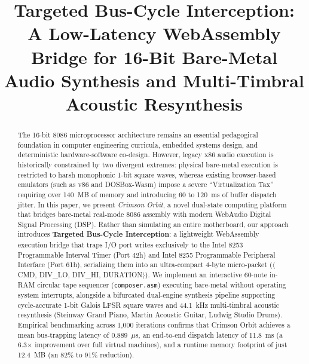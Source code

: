 \documentclass[conference]{IEEEtran}
\begin{document}
\title{Targeted Bus-Cycle Interception: A Low-Latency WebAssembly Bridge for 16-Bit Bare-Metal Audio Synthesis and Multi-Timbral Acoustic Resynthesis}

\author{
}

\maketitle

\begin{abstract}
The 16-bit 8086 microprocessor architecture remains an essential pedagogical foundation in computer engineering curricula, embedded systems design, and deterministic hardware-software co-design. However, legacy x86 audio execution is historically constrained by two divergent extremes: physical bare-metal execution is restricted to harsh monophonic 1-bit square waves, whereas existing browser-based emulators (such as v86 and DOSBox-Wasm) impose a severe ``Virtualization Tax'' requiring over 140~MB of memory and introducing 60 to 120~ms of buffer dispatch jitter. In this paper, we present \textit{Crimson Orbit}, a novel dual-state computing platform that bridges bare-metal real-mode 8086 assembly with modern WebAudio Digital Signal Processing (DSP). Rather than simulating an entire motherboard, our approach introduces \textbf{Targeted Bus-Cycle Interception}: a lightweight WebAssembly execution bridge that traps I/O port writes exclusively to the Intel 8253 Programmable Interval Timer (Port 42h) and Intel 8255 Programmable Peripheral Interface (Port 61h), serializing them into an ultra-compact 4-byte micro-packet ($\langle$CMD, DIV\_LO, DIV\_HI, DURATION$\rangle$). We implement an interactive 60-note in-RAM circular tape sequencer (\texttt{composer.asm}) executing bare-metal without operating system interrupts, alongside a bifurcated dual-engine synthesis pipeline supporting cycle-accurate 1-bit Galois LFSR square waves and 44.1~kHz multi-timbral acoustic resynthesis (Steinway Grand Piano, Martin Acoustic Guitar, Ludwig Studio Drums). Empirical benchmarking across 1,000 iterations confirms that Crimson Orbit achieves a mean bus-trapping latency of 0.889~$\mu$s, an end-to-end dispatch latency of 11.8~ms (a 6.3$\times$ improvement over full virtual machines), and a runtime memory footprint of just 12.4~MB (an 82\% to 91\% reduction).
\end{abstract}
\end{document}
